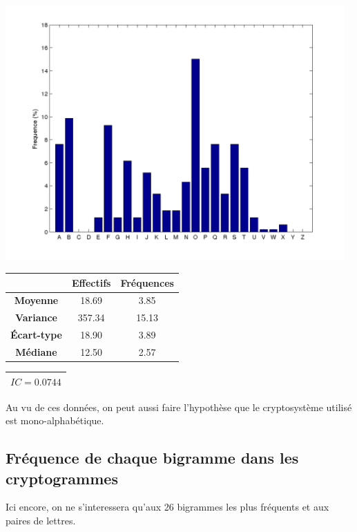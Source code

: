 \documentclass[a4paper, titlepage]{livret}
\begin{document}
\begin{minipage}[c]{.85\linewidth}\centering
\includegraphics[width=13cm]{img/resMono.png}
\label{fig4}
\end{minipage} \hfill

\begin{center}
\begin{tabular}{|c|c|c|}
	\hline
	& \textbf{Effectifs} & \textbf{Fréquences}\\
	\hline
	\textbf{Moyenne} &   18.69 &  3.85\\
	\hline
	\textbf{Variance} &  357.34 &  15.13\\
	\hline
	\textbf{Écart-type} &   18.90 &  3.89\\
	\hline
	\textbf{Médiane} &   12.50 &  2.57\\
	\hline
\end{tabular}
\label{tab99}
\end{center}

\begin{center}
\begin{tabular}{|c|}
\hline
\textbf{$IC = 0.0744$}\\
\hline
\end{tabular}
\label{tab56}
\end{center}

Au vu de ces données, on peut aussi faire l'hypothèse que le cryptosystème utilisé est mono-alphabétique.

\subsection{Fréquence de chaque bigramme dans les cryptogrammes}
Ici encore, on ne s'interessera qu'aux 26 bigrammes les plus fréquents et aux paires de lettres.
\end{document}
